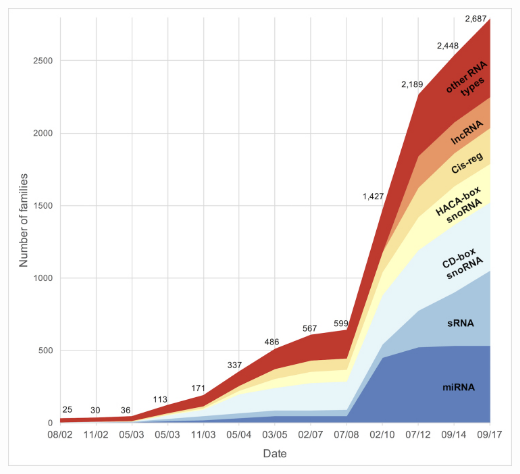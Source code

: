 \documentclass[landscape]{slides}
\begin{document}
\begin{slide}
\begin{center}
\includegraphics[height=7in]{figs/kalvari-17-fig1}
\end{center}
\vfill
\tiny {}
\end{slide}
\end{document}
